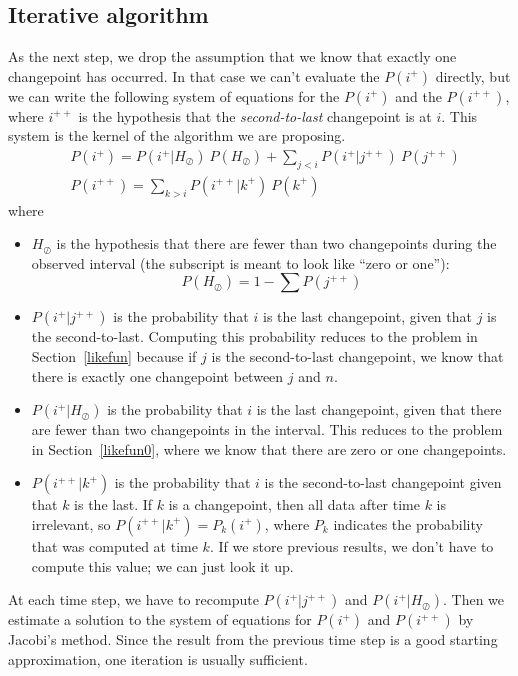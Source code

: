 \documentclass[twocolumn,11pt]{article}
\begin{document}
\subsection{Iterative algorithm}

As the next step, we drop the assumption that we know that exactly one
changepoint has occurred.  In that case we can't evaluate the $P(i^+)$
directly, but we can write the following system of equations for the
$P(i^+)$ and the $P(i^{++})$, where $i^{++}$ is the hypothesis
that the {\em second-to-last} changepoint is at $i$.  This system is
the kernel of the algorithm we are proposing.
%
\renewcommand{\P}{\ P}
\newcommand{\jc}{H_\oslash}
%
\begin{equation}
\begin{split}
&P(i^+) = P(i^+ | \jc) \P(\jc) + \sum_{j<i} P(i^+ | j^{++}) \P(j^{++})   \\
&P(i^{++}) = \sum_{k>i} P(i^{++} | k^+) \P(k^+) 
\label{cpp}
\end{split}
\end{equation}
%
where
%
\begin{itemize}
%
\item $\jc$ is the hypothesis that there are fewer than two
changepoints during the observed interval (the subscript is meant
to look like ``zero or one''):
%
\begin{equation}
P(\jc) = 1 - \sum P(j^{++})
\end{equation}
%
\item $P(i^+ | j^{++})$ is the probability that $i$ is the last
changepoint, given that $j$ is the second-to-last.  Computing this
probability reduces to the problem in Section~\ref{likefun}
because if $j$ is the second-to-last changepoint,
we know that there is exactly one changepoint between $j$ and $n$.
%
\item $P(i^+ | \jc)$ is the probability that $i$ is the last
changepoint, given that there are fewer than two changepoints in the
interval.  This reduces to the problem in Section~\ref{likefun0},
where we know that there are zero or one changepoints.
%
\item $P(i^{++} | k^+)$ is the probability that $i$ is the
second-to-last changepoint given that $k$ is the last.  If $k$ is a
changepoint, then all data after time $k$ is irrelevant, so $P(i^{++}
| k^+) = P_k(i^+)$, where $P_k$ indicates the probability that was
computed at time $k$.  If we store previous results, we don't
have to compute this value; we can just look it up.
%
\end{itemize}
%
At each time step, we have to recompute $P(i^+ | j^{++})$ and $P(i^+ |
\jc)$.  Then we estimate a solution to the system of equations for
$P(i^+)$ and $P(i^{++})$ by Jacobi's method.
Since the result from the previous time
step is a good starting approximation, one iteration
is usually sufficient.
\end{document}
